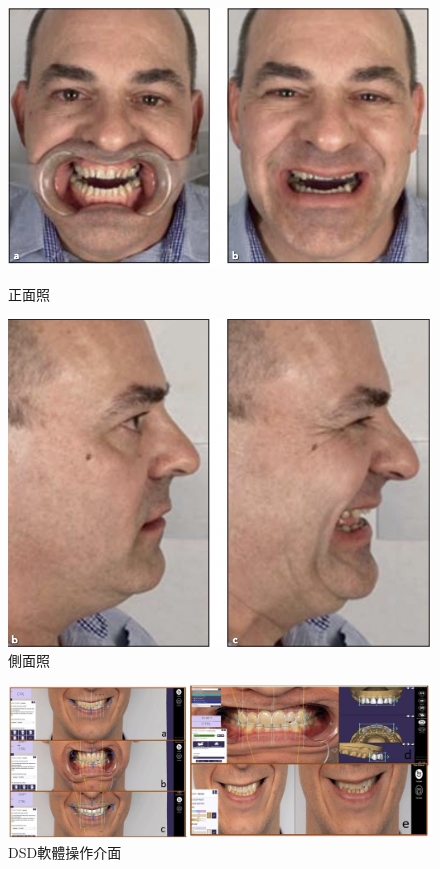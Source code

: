 \begin{figure}[H]
\centering
\begin{minipage}[b]{0.4\textwidth} %
\centering
\includegraphics[width=1\textwidth]{paste_src/2023-02-07-20-49-33.png}
\caption{正面照}
\label{fig:正面}
\end{minipage}
\begin{minipage}[b]{0.4\textwidth} %
\centering
\includegraphics[width=1\textwidth]{paste_src/2023-02-07-20-50-39.png}
\caption{側面照}
\label{fig:側面}
\end{minipage}
\end{figure}


\begin{figure}[H]
\centering
\includegraphics[width=1\textwidth]{paste_src/2023-02-07-21-26-21.png}
\caption{DSD軟體操作介面}
\label{}
\end{figure}

